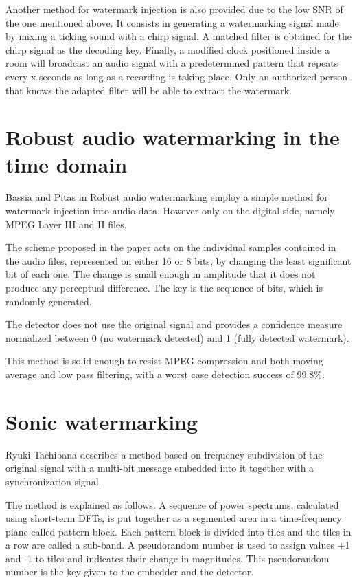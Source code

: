 Another method for watermark injection is also provided due to the low SNR of the one mentioned above. It consists in generating a watermarking signal made by mixing a ticking sound with a chirp signal. A matched filter is obtained for the chirp signal as the decoding key. Finally, a modified clock positioned inside a room will broadcast an audio signal with a predetermined pattern that repeats every x seconds as long as a recording is taking place. Only an authorized person that knows the adapted filter will be able to extract the watermark.



\section{Robust audio watermarking in the time domain}
Bassia and Pitas \cite{robust} in Robust audio watermarking employ a simple method for watermark injection into audio data. However only on the digital side, namely MPEG Layer III and II files. 

The scheme proposed in the paper acts on the individual samples contained in the audio files, represented on either 16 or 8 bits, by changing the least significant bit of each one. The change is small enough in amplitude that it does not produce any perceptual difference. The key is the sequence of bits, which is randomly generated. 

The detector does not use the original signal and provides a confidence measure normalized between 0 (no watermark detected) and 1 (fully detected watermark). 

This method is solid enough to resist MPEG compression and both moving average and low pass filtering, with a worst case detection success of 99.8\%.


\section{Sonic watermarking}
Ryuki Tachibana \cite{sonichu} describes a method based on frequency subdivision of the original signal with a multi-bit message embedded into it together with a synchronization signal. 

The method is explained as follows. A sequence of power spectrums, calculated using short-term DFTs, is put together as a segmented area in a time-frequency plane called pattern block. Each pattern block is divided into tiles and the tiles in a row are called a sub-band. A pseudorandom number is used to assign values +1 and -1 to tiles and indicates their change in magnitudes. This pseudorandom number is the key given to the embedder and the detector.


